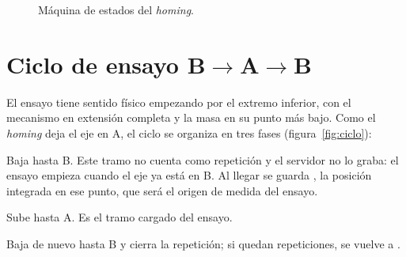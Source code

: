 \begin{figure}[H]
\centering
{}
\caption{Máquina de estados del \emph{homing}.}
\label{fig:homing}
\end{figure}

\section{Ciclo de ensayo B$\rightarrow$A$\rightarrow$B}
\label{sec:fw-ciclo}

El ensayo tiene sentido físico empezando por el extremo inferior, con el mecanismo en extensión
completa y la masa en su punto más bajo. Como el \emph{homing} deja el eje en A, el ciclo se
organiza en tres fases (figura~\ref{fig:ciclo}):

\begin{description}[style=nextline,leftmargin=1.5em]
  \item[\codigo{CYC\_POS\_B} --- colocación] Baja hasta B. Este tramo no cuenta como repetición y el
        servidor no lo graba: el ensayo empieza cuando el eje ya está en B. Al llegar se guarda
        , la posición integrada en ese punto, que será el origen de medida del
        ensayo.
  \item[\codigo{CYC\_TO\_A} --- ida] Sube hasta A. Es el tramo cargado del ensayo.
  \item[\codigo{CYC\_TO\_B} --- vuelta] Baja de nuevo hasta B y cierra la repetición; si quedan
        repeticiones, se vuelve a .
\end{description}

